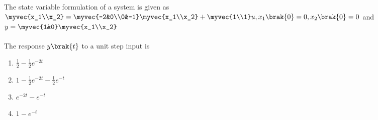 \item{
The state variable formulation of a system is given as\\
$\myvec{x_1\\x_2}=\myvec{-2&0\\0&-1}\myvec{x_1\\x_2}+\myvec{1\\1}u, x_1\brak{0}=0,x_2\brak{0}=0$ and $y=\myvec{1&0}\myvec{x_1\\x_2}$\\\\
The response $y\brak{t}$ to a unit step input is
\begin{multicols}{4}
\begin{enumerate}
\item $\frac{1}{2}-\frac{1}{2}e^{-2t}$
\item $1-\frac{1}{2}e^{-2t}-\frac{1}{2}e^{-t}$
\item $e^{-2t}-e^{-t}$
\item $1-e^{-t}$
\end{enumerate}
\end{multicols}
}
